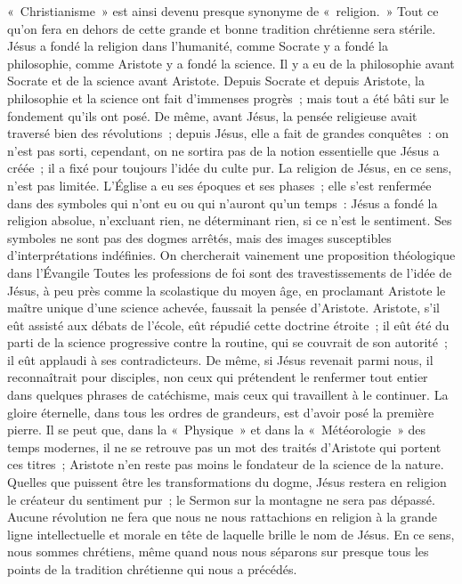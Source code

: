 \documentclass[french,twoside]{book} %
\begin{document}
« Christianisme » est ainsi devenu presque synonyme de « religion. » Tout ce qu’on fera en dehors de cette grande et bonne tradition chrétienne sera stérile. Jésus a fondé la religion dans l’humanité, comme Socrate y a fondé la philosophie, comme Aristote y a fondé la science. Il y a eu de la philosophie avant Socrate et de la science avant Aristote. Depuis Socrate et depuis Aristote, la philosophie et la science ont fait d’immenses progrès ; mais tout a été bâti sur le fondement qu’ils ont posé. De même, avant Jésus, la pensée religieuse avait traversé bien des révolutions ; depuis Jésus, elle a fait de grandes conquêtes : on n’est pas sorti, cependant, on ne sortira pas de la notion essentielle que Jésus a créée ; il a fixé pour toujours l’idée du culte pur. La religion de Jésus, en ce sens, n’est pas limitée. L’Église a eu ses époques et ses phases ; elle s’est renfermée dans des symboles qui n’ont eu ou qui n’auront qu’un temps : Jésus a fondé la religion absolue, n’excluant rien, ne déterminant rien, si ce n’est le sentiment. Ses symboles ne sont pas des dogmes arrêtés, mais des images susceptibles d’interprétations indéfinies. On chercherait vainement une proposition théologique dans l’Évangile Toutes les professions de foi sont des travestissements de l’idée de Jésus, à peu près comme la scolastique du moyen âge, en proclamant Aristote le maître unique d’une science achevée, faussait la pensée d’Aristote. Aristote, s’il eût assisté aux débats de l’école, eût répudié cette doctrine étroite ; il eût été du parti de la science progressive contre la routine, qui se couvrait de son autorité ; il eût applaudi à ses contradicteurs. De même, si Jésus revenait parmi nous, il reconnaîtrait pour disciples, non ceux qui prétendent le renfermer tout entier dans quelques phrases de catéchisme, mais ceux qui travaillent à le continuer. La gloire éternelle, dans tous les ordres de grandeurs, est d’avoir posé la première pierre. Il se peut que, dans la « Physique » et dans la « Météorologie » des temps modernes, il ne se retrouve pas un mot des traités d’Aristote qui portent ces titres ; Aristote n’en reste pas moins le fondateur de la science de la nature. Quelles que puissent être les transformations du dogme, Jésus restera en religion le créateur du sentiment pur ; le Sermon sur la montagne ne sera pas dépassé. Aucune révolution ne fera que nous ne nous rattachions en religion à la grande ligne intellectuelle et morale en tête de laquelle brille le nom de Jésus. En ce sens, nous sommes chrétiens, même quand nous nous séparons sur presque tous les points de la tradition chrétienne qui nous a précédés.\par
\end{document}
